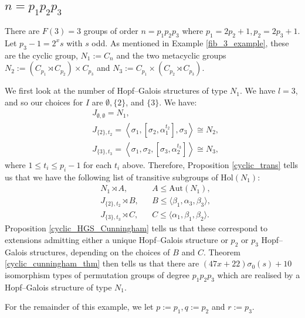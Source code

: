 \documentclass[a4paper,reqno]{amsart}
\theoremstyle{definition}
\newcommand{\Aut}{\mathrm{Aut}}
\newcommand{\Hol}{\mathrm{Hol}}
\begin{document}
\subsection{\texorpdfstring{$n=p_1p_2p_3$}{n=p1q2r3}}
There are $F(3)=3$ groups of order $n=p_1p_2p_3$ where $p_1=2p_2+1,p_2=2p_3+1$. Let $p_3-1=2^xs$ with $s$ odd. As mentioned in Example \ref{fib_3_example}, these are the cyclic group, $N_1:=C_n$ and the two metacyclic groups $N_2:=(C_{p_1} \rtimes C_{p_2}) \times C_{p_3}$ and $N_3:=C_{p_1} \times (C_{p_2} \rtimes C_{p_3})$.

We first look at the number of Hopf--Galois structures of type $N_1$. We have $l=3$, and so our choices for $I$ are $\emptyset,\{2\}$, and $\{3\}$. We have:
\begin{align*}
    &J_{\emptyset,\emptyset}=N_1,\\
    &J_{\{2\},t_2}=\left\langle \sigma_1, \left[\sigma_2,\alpha_1^{t_2}\right], \sigma_3\right\rangle \cong N_2,\\
    &J_{\{3\},t_3}=\left\langle \sigma_1, \sigma_2, \left[\sigma_3,\alpha_2^{t_3}\right] \right\rangle \cong N_3,
\end{align*}
where $1 \leq t_i \leq p_i-1$ for each $t_i$ above. Therefore, Proposition \ref{cyclic_trans} tells us that we have the following list of transitive subgroups of $\Hol(N_1)$:
\begin{align*}
    &N_1 \rtimes A,                  &&A \leq \Aut(N_1),\\
    &J_{\{2\},t_2} \rtimes B,    &&B \leq \langle \beta_1,\alpha_3,\beta_3 \rangle,\\
    &J_{\{3\},t_3} \rtimes C,    &&C \leq \langle \alpha_1,\beta_1,\beta_2 \rangle.
\end{align*}
Proposition \ref{cyclic_HGS_Cunningham} tells us that these correspond to extensions admitting either a unique Hopf--Galois structure or $p_2$ or $p_3$ Hopf--Galois structures, depending on the choices of $B$ and $C$. Theorem \ref{cyclic_cunningham_thm} then tells us that there are $(47x+22)\sigma_0(s)+10$ isomorphism types of permutation groups of degree $p_1p_2p_3$ which are realised by a Hopf--Galois structure of type $N_1$.

For the remainder of this example, we let $p:=p_1, q:=p_2$ and $r:=p_3$. 
\end{document}
